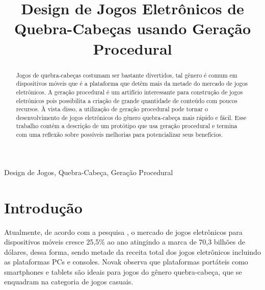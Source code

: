\documentclass[10pt, conference, compsocconf]{IEEEtran}
\begin{document}
\title{Design de Jogos Eletrônicos de Quebra-Cabeças usando Geração Procedural}
\author{
}

\maketitle

\begin{abstract}

Jogos de quebra-cabeças costumam ser bastante divertidos, tal gênero é comum em dispositivos móveis que é a plataforma que detêm mais da metade do mercado de jogos eletrônicos. A geração procedural é um artifício interessante para construção de jogos eletrônicos pois possibilita a criação de grande quantidade de conteúdo com poucos recursos. À vista disso, a utilização de geração procedural pode tornar o desenvolvimento de jogos eletrônicos do gênero quebra-cabeça mais rápido e fácil. Esse trabalho contém a descrição de um protótipo que usa geração procedural e termina com uma reflexão sobre possíveis melhorias para potencializar seus benefícios.

\end{abstract}

\begin{IEEEkeywords}

Design de Jogos, Quebra-Cabeça, Geração Procedural

\end{IEEEkeywords}

\IEEEpeerreviewmaketitle

\section{Introdução}

Atualmente, de acordo com a pesquisa \parencite{mobilerevenues}, o mercado de jogos eletrônicos para dispositivos móveis cresce 25,5\% ao ano atingindo a marca de 70,3 bilhões de dólares, dessa forma, sendo metade da receita total dos jogos eletrônicos incluindo as plataformas PCs e consoles. Novak \parencite{novak2010gamedev} observa que plataformas portáteis como smartphones e tablets são ideais para jogos do gênero quebra-cabeça, que se enquadram na categoria de jogos casuais.
\end{document}
